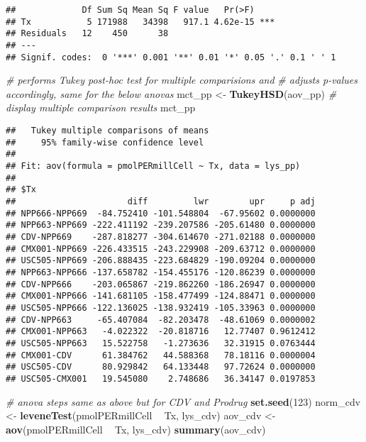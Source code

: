 \documentclass[]{article}
\newenvironment{Shaded}{\begin{snugshade}}{\end{snugshade}}
\newcommand{\CommentTok}[1]{\textcolor[rgb]{0.56,0.35,0.01}{\textit{#1}}}
\newcommand{\DecValTok}[1]{\textcolor[rgb]{0.00,0.00,0.81}{#1}}
\newcommand{\KeywordTok}[1]{\textcolor[rgb]{0.13,0.29,0.53}{\textbf{#1}}}
\newcommand{\NormalTok}[1]{#1}
\newcommand{\OperatorTok}[1]{\textcolor[rgb]{0.81,0.36,0.00}{\textbf{#1}}}
\newcommand{\StringTok}[1]{\textcolor[rgb]{0.31,0.60,0.02}{#1}}
\begin{document}
\begin{verbatim}
##             Df Sum Sq Mean Sq F value   Pr(>F)    
## Tx           5 171988   34398   917.1 4.62e-15 ***
## Residuals   12    450      38                     
## ---
## Signif. codes:  0 '***' 0.001 '**' 0.01 '*' 0.05 '.' 0.1 ' ' 1
\end{verbatim}

\begin{Shaded}
\begin{Highlighting}[]
\CommentTok{# performs Tukey post-hoc test for multiple comparisions and}
\CommentTok{# adjusts p-values accordingly, same for the below anovas}
\NormalTok{mct_pp <-}\StringTok{ }\KeywordTok{TukeyHSD}\NormalTok{(aov_pp)}
\CommentTok{# display multiple comparison results}
\NormalTok{mct_pp}
\end{Highlighting}
\end{Shaded}

\begin{verbatim}
##   Tukey multiple comparisons of means
##     95% family-wise confidence level
## 
## Fit: aov(formula = pmolPERmillCell ~ Tx, data = lys_pp)
## 
## $Tx
##                      diff         lwr        upr     p adj
## NPP666-NPP669  -84.752410 -101.548804  -67.95602 0.0000000
## NPP663-NPP669 -222.411192 -239.207586 -205.61480 0.0000000
## CDV-NPP669    -287.818277 -304.614670 -271.02188 0.0000000
## CMX001-NPP669 -226.433515 -243.229908 -209.63712 0.0000000
## USC505-NPP669 -206.888435 -223.684829 -190.09204 0.0000000
## NPP663-NPP666 -137.658782 -154.455176 -120.86239 0.0000000
## CDV-NPP666    -203.065867 -219.862260 -186.26947 0.0000000
## CMX001-NPP666 -141.681105 -158.477499 -124.88471 0.0000000
## USC505-NPP666 -122.136025 -138.932419 -105.33963 0.0000000
## CDV-NPP663     -65.407084  -82.203478  -48.61069 0.0000002
## CMX001-NPP663   -4.022322  -20.818716   12.77407 0.9612412
## USC505-NPP663   15.522758   -1.273636   32.31915 0.0763444
## CMX001-CDV      61.384762   44.588368   78.18116 0.0000004
## USC505-CDV      80.929842   64.133448   97.72624 0.0000000
## USC505-CMX001   19.545080    2.748686   36.34147 0.0197853
\end{verbatim}

\begin{Shaded}
\begin{Highlighting}[]
\CommentTok{# anova steps same as above but for CDV and Prodrug}
\KeywordTok{set.seed}\NormalTok{(}\DecValTok{123}\NormalTok{)}
\NormalTok{norm_cdv <-}\StringTok{ }\KeywordTok{leveneTest}\NormalTok{(pmolPERmillCell }\OperatorTok{~}\StringTok{ }\NormalTok{Tx, lys_cdv)}
\NormalTok{aov_cdv <-}\StringTok{ }\KeywordTok{aov}\NormalTok{(pmolPERmillCell }\OperatorTok{~}\StringTok{ }\NormalTok{Tx, lys_cdv)}
\KeywordTok{summary}\NormalTok{(aov_cdv)}
\end{Highlighting}
\end{Shaded}
\end{document}
